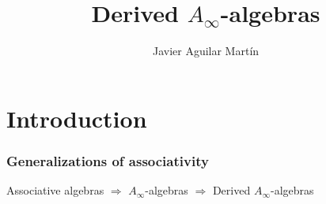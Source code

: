 \documentclass{beamer}
\title{Derived $A_\infty$-algebras}
\author{Javier Aguilar Mart\'in}
\date{}
\institute{BYMAT 2022}
\theoremstyle{definition}
\begin{document}
\frame{\titlepage}

%
% 
% 
% 

% 



\newcommand{\seti}{\setcounter{saveenumi}{\value{enumi}}}
\newcommand{\conti}{\setcounter{enumi}{\value{saveenumi}}}

\makeatletter
\makeatother


%
%
%
%
%
%
%
\section{Introduction}
\begin{frame}
\frametitle{Generalizations of associativity}

Associative algebras $\Rightarrow$ $A_\infty$-algebras $\Rightarrow$ Derived $A_\infty$-algebras

\end{frame}
\end{document}
